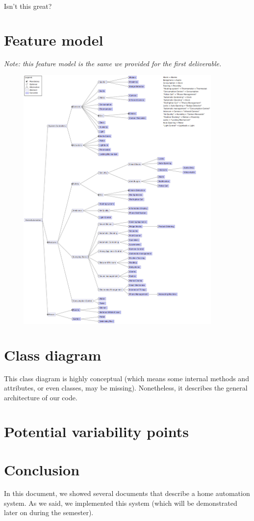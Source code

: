 			Isn't this great?
		
	\section{Feature model}
		\textit{Note: this feature model is the same we provided for the first deliverable.}
		
        \begin{figure}[H]
            \includegraphics[width=0.9\textwidth]{FeatureModel_2.png}
        \end{figure}
	
	\section{Class diagram}
		This class diagram is highly conceptual (which means some internal methods and attributes, or even classes, may be missing). Nonetheless, it describes the general architecture of our code.
		
		
	\section{Potential variability points}
	
	\section{Conclusion}
		In this document, we showed several documents that describe a home automation system.
		As we said, we implemented this system (which will be demonstrated later on during the semester).


